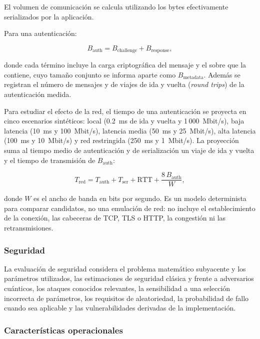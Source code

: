 El volumen de comunicación se calcula utilizando los bytes efectivamente serializados
por la aplicación.

Para una autenticación:

\begin{equation}
    B_{\text{auth}}
    =
    B_{\text{challenge}}
    +
    B_{\text{response}},
\end{equation}

donde cada término incluye la carga criptográfica del mensaje y el sobre que la contiene,
cuyo tamaño conjunto se informa aparte como $B_{\text{metadata}}$. Además se registran el
número de mensajes y de viajes de ida y vuelta (\textit{round trips}) de la autenticación
medida.

Para estudiar el efecto de la red, el tiempo de una autenticación se proyecta en cinco
escenarios sintéticos: local (0.2~ms de ida y vuelta y 1\,000~Mbit/s), baja latencia
(10~ms y 100~Mbit/s), latencia media (50~ms y 25~Mbit/s), alta latencia (100~ms y
10~Mbit/s) y red restringida (250~ms y 1~Mbit/s). La proyección suma al tiempo medio de
autenticación y de serialización un viaje de ida y vuelta y el tiempo de transmisión de
$B_{\text{auth}}$:

\begin{equation}
    T_{\text{red}}
    =
    T_{\text{auth}} + T_{\text{ser}} + \text{RTT} + \frac{8\,B_{\text{auth}}}{W},
\end{equation}

donde $W$ es el ancho de banda en bits por segundo. Es un modelo determinista para
comparar candidatos, no una emulación de red: no incluye el establecimiento de la
conexión, las cabeceras de TCP, TLS o HTTP, la congestión ni las retransmisiones.


\subsubsection{Seguridad}

La evaluación de seguridad considera el problema matemático subyacente y los parámetros
utilizados, las estimaciones de seguridad clásica y frente a adversarios cuánticos, los
ataques conocidos relevantes, la sensibilidad a una selección incorrecta de parámetros,
los requisitos de aleatoriedad, la probabilidad de fallo cuando sea aplicable y las
vulnerabilidades derivadas de la implementación.


\subsubsection{Características operacionales}

